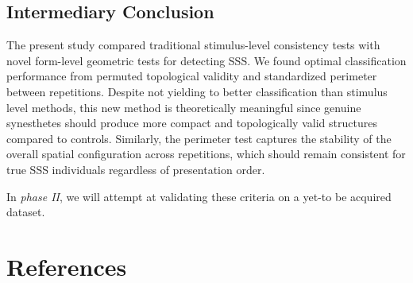 \documentclass[
  man,
  floatsintext,
  longtable,
  a4paper,
  nolmodern,
  notxfonts,
  notimes,
  colorlinks=true,linkcolor=blue,citecolor=blue,urlcolor=blue]{apa7}
\begin{document}
\subsection{Intermediary Conclusion}\label{sec-conclusions}

The present study compared traditional stimulus-level consistency tests
with novel form-level geometric tests for detecting SSS. We found
optimal classification performance from permuted topological validity
and standardized perimeter between repetitions. Despite not yielding to
better classification than stimulus level methods, this new method is
theoretically meaningful since genuine synesthetes should produce more
compact and topologically valid structures compared to controls.
Similarly, the perimeter test captures the stability of the overall
spatial configuration across repetitions, which should remain consistent
for true SSS individuals regardless of presentation order.

In \emph{phase II}, we will attempt at validating these criteria on a
yet-to be acquired dataset.

\section{References}\label{references}
\end{document}
